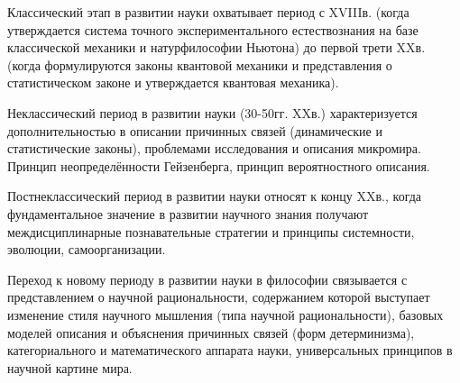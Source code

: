 \documentclass[exam_answers.tex]{subfiles}
\begin{document}
Классический этап в развитии науки охватывает период с XVIIIв. (когда утверждается система точного экспериментального естествознания на базе классической механики и натурфилософии Ньютона) до первой трети XXв. (когда формулируются законы квантовой механики и представления о статистическом законе и утверждается квантовая механика).

Неклассический период в развитии науки (30-50гг. XXв.) характеризуется дополнительностью в описании причинных связей (динамические и статистические законы), проблемами исследования и описания микромира. Принцип неопределённости Гейзенберга, принцип вероятностного описания.

Постнеклассический период в развитии науки относят к концу XXв., когда фундаментальное значение в развитии научного знания получают междисциплинарные познавательные стратегии и принципы системности, эволюции, самоорганизации.

Переход к новому периоду в развитии науки в философии связывается с представлением о научной рациональности, содержанием которой выступает изменение стиля научного мышления (типа научной рациональности), базовых моделей описания и объяснения причинных связей (форм детерминизма), категориального и математического аппарата науки, универсальных принципов в научной картине мира.
\end{document}
